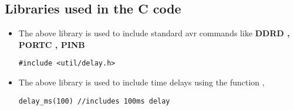 \documentclass{article}
\begin{document}
\begin{itemize}
    \subsection*{Libraries used in the C code}
    \begin{itemize}
        \begin{lstlisting}[style=CStyle]
#include <avr/io.h>\end{lstlisting}
        \item The above library is used to include standard avr commands like \textbf{DDRD , PORTC , PINB}

            \begin{lstlisting}[style=CStyle]
#include <util/delay.h>\end{lstlisting}
        \item The above library is used to include time delays using the function , \begin{lstlisting}[style=CStyle]
delay_ms(100) //includes 100ms delay \end{lstlisting}
    \end{itemize}
\end{itemize}

\end{document}
